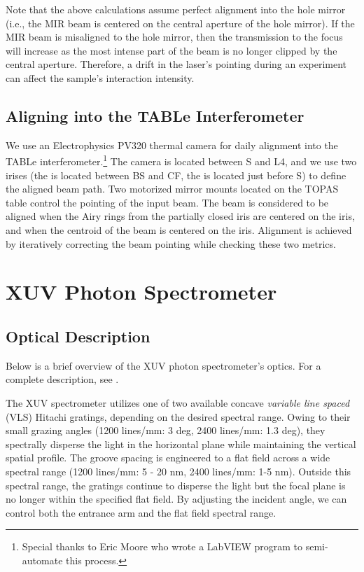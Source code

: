 Note that the above calculations assume perfect alignment into the hole mirror (i.e., the MIR beam is centered on the central aperture of the hole mirror). If the MIR beam is misaligned to the hole mirror, then the transmission to the focus will increase as the most intense part of the beam is no longer clipped by the central aperture. Therefore, a drift in the laser's pointing during an experiment can affect the sample's interaction intensity.

\subsection{Aligning into the TABLe Interferometer}

We use an Electrophysics PV320 thermal camera for daily alignment into the TABLe interferometer.\footnote{Special thanks to Eric Moore who wrote a LabVIEW program to semi-automate this process.} The camera is located between S and L4, and we use two irises (the  is located between BS and CF, the  is located just before S) to define the aligned beam path. Two motorized mirror mounts located on the TOPAS table control the pointing of the input beam. The beam is considered to be aligned when the Airy rings from the partially closed  iris are centered on the  iris, and when the centroid of the beam is centered on the  iris. Alignment is achieved by iteratively correcting the beam pointing while checking these two metrics.

\section{XUV Photon Spectrometer}
\label{sec:XUV_spectrometer}

\subsection{Optical Description}

Below is a brief overview of the XUV photon spectrometer's optics. For a complete description, see \cite{hagemanComplexAttosecondTransient2020}.

The XUV spectrometer utilizes one of two available concave \textit{variable line spaced} (VLS) Hitachi gratings, depending on the desired spectral range. Owing to their small grazing angles (1200 lines/mm: 3 deg, 2400 lines/mm: 1.3 deg), they spectrally disperse the light in the horizontal plane while maintaining the vertical spatial profile. The groove spacing is engineered to a flat field across a wide spectral range (1200 lines/mm: 5 - 20 nm, 2400 lines/mm: 1-5 nm). Outside this spectral range, the gratings continue to disperse the light but the focal plane is no longer within the specified flat field. By adjusting the incident angle, we can control both the entrance arm and the flat field spectral range.

